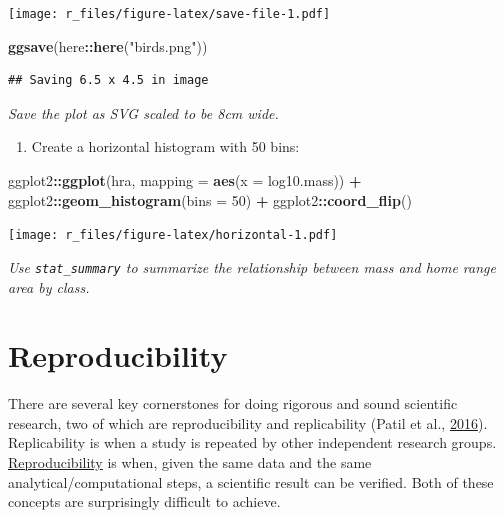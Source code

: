 \documentclass[]{Nemilov}
\newenvironment{Shaded}{\begin{snugshade}}{\end{snugshade}}
\newcommand{\DataTypeTok}[1]{\textcolor[rgb]{0.13,0.29,0.53}{#1}}
\newcommand{\DecValTok}[1]{\textcolor[rgb]{0.00,0.00,0.81}{#1}}
\newcommand{\KeywordTok}[1]{\textcolor[rgb]{0.13,0.29,0.53}{\textbf{#1}}}
\newcommand{\NormalTok}[1]{#1}
\newcommand{\OperatorTok}[1]{\textcolor[rgb]{0.81,0.36,0.00}{\textbf{#1}}}
\newcommand{\StringTok}[1]{\textcolor[rgb]{0.31,0.60,0.02}{#1}}
\providecommand{\tightlist}{%
  \setlength{\itemsep}{0pt}\setlength{\parskip}{0pt}}
\begin{document}
\texttt{[image: r\_files/figure-latex/save-file-1.pdf]}

\begin{Shaded}
\begin{Highlighting}[]
\KeywordTok{ggsave}\NormalTok{(here}\OperatorTok{::}\KeywordTok{here}\NormalTok{(}\StringTok{"birds.png"}\NormalTok{))}
\end{Highlighting}
\end{Shaded}

\begin{verbatim}
## Saving 6.5 x 4.5 in image
\end{verbatim}

\emph{Save the plot as SVG scaled to be 8cm wide.}

\begin{enumerate}
\def\labelenumi{\arabic{enumi}.}
\setcounter{enumi}{9}
\tightlist
\item
  Create a horizontal histogram with 50 bins:
\end{enumerate}

\begin{Shaded}
\begin{Highlighting}[]
\NormalTok{ggplot2}\OperatorTok{::}\KeywordTok{ggplot}\NormalTok{(hra, }\DataTypeTok{mapping =} \KeywordTok{aes}\NormalTok{(}\DataTypeTok{x =}\NormalTok{ log10.mass)) }\OperatorTok{+}
\StringTok{  }\NormalTok{ggplot2}\OperatorTok{::}\KeywordTok{geom_histogram}\NormalTok{(}\DataTypeTok{bins =} \DecValTok{50}\NormalTok{) }\OperatorTok{+}
\StringTok{  }\NormalTok{ggplot2}\OperatorTok{::}\KeywordTok{coord_flip}\NormalTok{()}
\end{Highlighting}
\end{Shaded}

\texttt{[image: r\_files/figure-latex/horizontal-1.pdf]}

\emph{Use \texttt{stat\_summary} to summarize the relationship between mass and home range area by class.}

\hypertarget{r-reproducibility}{%
\chapter{Reproducibility}\label{r-reproducibility}}

There are several key cornerstones for doing rigorous and sound scientific
research, two of which are reproducibility and replicability (Patil et al., \protect\hyperlink{ref-Patil2016}{2016}). Replicability is
when a study is repeated by other independent research groups. \href{https://en.wikipedia.org/wiki/Reproducibility}{Reproducibility}
is when, given the same data and the same analytical/computational steps, a
scientific result can be verified. Both of these concepts are surprisingly
difficult to achieve.
\end{document}
